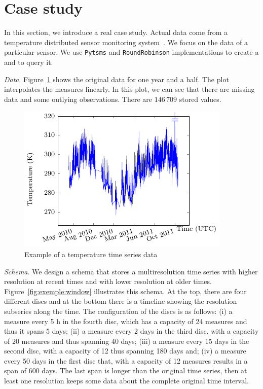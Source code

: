 
\section{Case study}
\label{sec:example}

In this section, we introduce a real case study. Actual data come from
a temperature distributed sensor monitoring system~\cite{alippi10}. We
focus on the data of a particular sensor. We use \texttt{Pytsms} and
\texttt{RoundRobinson} implementations to create a  and to
query it.

\emph{Data}. Figure~\ref{fig:exemple:original} shows the original data
for one year and a half. The plot interpolates the measures
linearly. In this plot, we can see that there are missing data and
some outlying observations. There are $146\,709$ stored values.

\begin{figure}[tp]
  \centering
  \includegraphics{fig_exemple_original.pdf}
  \caption{Example of a temperature time series data}
  \label{fig:exemple:original}
\end{figure}

\emph{Schema}. We design a  schema that stores a
multiresolution time series with higher resolution at recent times and
with lower resolution at older times. Figure~\ref{fig:exemple:window}
illustrates this schema. At the top, there are four different discs
and at the bottom there is a timeline showing the resolution subseries
along the time. The configuration of the discs is as follows: (i) a
measure every 5 h in the fourth disc, which has a capacity of 24
measures and thus it spans 5 days; (ii) a measure every 2 days in the
third disc, with a capacity of 20 measures and thus spanning 40 days;
(iii) a measure every 15 days in the second disc, with a capacity of
12 thus spanning 180 days and; (iv) a measure every 50 days in the
first disc that, with a capacity of 12 measures results in a span of
600 days. The last span is longer than the original time series, then
at least one resolution keeps some data about the complete original
time interval.

